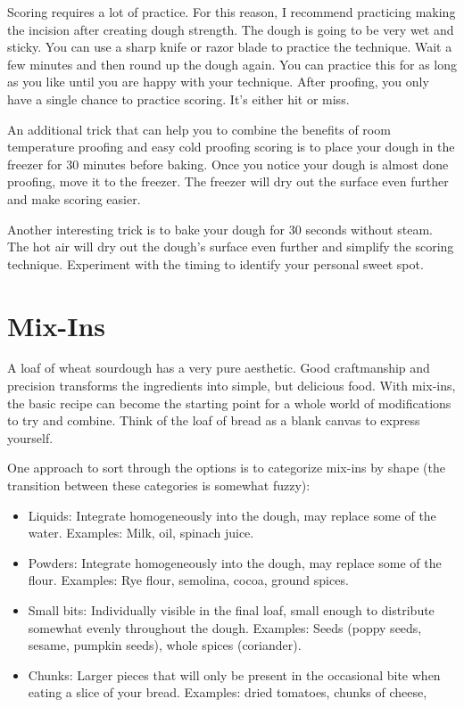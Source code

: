 Scoring requires a lot of practice. For this reason, I recommend
practicing making the incision after creating dough strength. The dough
is going to be very wet and sticky. You can use a sharp knife or razor
blade to practice the technique. Wait a few minutes and then round
up the dough again. You can practice this for as long as you like
until you are happy with your technique. After proofing, you only
have a single chance to practice scoring. It's either hit or miss.

An additional trick that can help you to combine the benefits
of room temperature proofing and easy cold proofing scoring
is to place your dough in the freezer for 30 minutes before baking.
Once you notice your dough is almost done proofing, move it to the
freezer. The freezer will dry out the surface even further and make
scoring easier.

Another interesting trick is to bake your dough for 30 seconds without steam.
The hot air will dry out the dough's surface even further and simplify
the scoring technique. Experiment with the timing to identify your personal
sweet spot.

\section{Mix-Ins}

A loaf of wheat sourdough has a very pure aesthetic. Good craftmanship and precision transforms the ingredients into simple, but delicious food. With mix-ins, the basic recipe can become the starting point for a whole world of modifications to try and combine. Think of the loaf of bread as a blank canvas to express yourself.

One approach to sort through the options is to categorize mix-ins by shape (the transition between these categories is somewhat fuzzy):
\begin{itemize}
  \item Liquids: Integrate homogeneously into the dough, may replace some of the water. Examples: Milk, oil, spinach juice.
  \item Powders: Integrate homogeneously into the dough, may replace some of the flour. Examples: Rye flour, semolina, cocoa, ground spices.
  \item Small bits: Individually visible in the final loaf, small enough to distribute somewhat evenly throughout the dough. Examples: Seeds (poppy seeds, sesame, pumpkin seeds), whole spices (coriander).
  \item Chunks: Larger pieces that will only be present in the occasional bite when eating a slice of your bread. Examples: dried tomatoes, chunks of cheese,
\end{itemize}

